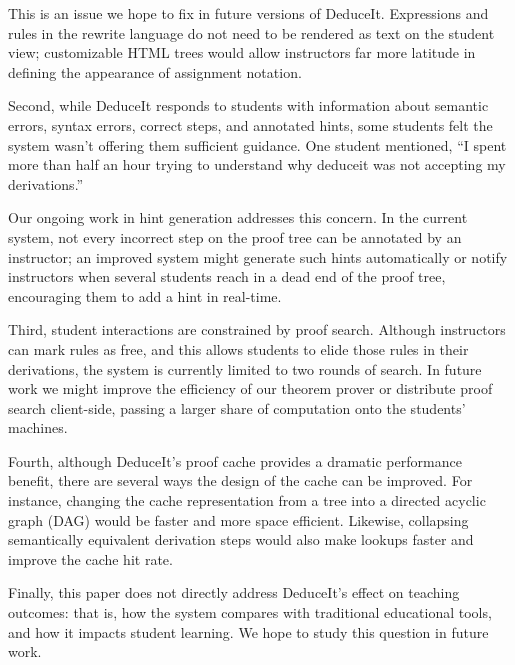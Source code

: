 \documentclass{sigchi}
\begin{document}
This is an issue we hope to fix in future versions of DeduceIt. Expressions and rules in the rewrite language do not need to be rendered as text on the student view; customizable HTML trees would allow instructors far more latitude in defining the appearance of assignment notation.

Second, while DeduceIt responds to students with information about semantic errors, syntax errors, correct steps, and annotated hints, some students felt the system wasn't offering them sufficient guidance. One student mentioned, ``I spent more than half an hour trying to understand why deduceit was not accepting my derivations.''

Our ongoing work in hint generation addresses this concern. In the current system, not every incorrect step on the proof tree can be annotated by an instructor; an improved system might generate such hints automatically or notify instructors when several students reach in a dead end of the proof tree, encouraging them to add a hint in real-time.

Third, student interactions are constrained by proof search. Although instructors can mark rules as free, and this allows students to elide those rules in their derivations, the system is currently limited to two rounds of search. In future work we might improve the efficiency of our theorem prover or distribute proof search client-side, passing a larger share of computation onto the students' machines.

Fourth, although DeduceIt's proof cache provides a dramatic performance benefit, there are several ways the design of the cache can be improved. For instance, changing the cache representation from a tree into a directed acyclic graph (DAG) would be faster and more space efficient. Likewise, collapsing semantically equivalent derivation steps would also make lookups faster and improve the cache hit rate.

Finally, this paper does not directly address DeduceIt's effect on teaching outcomes: that is, how the system compares with traditional educational tools, and how it impacts student learning. We hope to study this question in future work.



\end{document}

